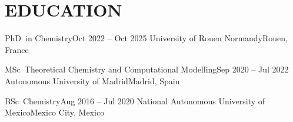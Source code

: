\section{EDUCATION}
\resumeSubHeadingListStart

  \resumeSubheading
    {PhD\ in Chemistry}{Oct 2022 -- Oct 2025}
    {University of Rouen Normandy}{Rouen, France}
  \resumeItemListStart
  \resumeItemListEnd

  \resumeSubheading
    {MSc\ Theoretical Chemistry and Computational Modelling}{Sep 2020 -- Jul 2022}
    {Autonomous University of Madrid}{Madrid, Spain}
  \resumeItemListStart
  \resumeItemListEnd

  \resumeSubheading
    {BSc\ Chemistry}{Aug 2016 -- Jul 2020}
    {National Autonomous University of Mexico}{Mexico City, Mexico}
  \resumeItemListStart
  \resumeItemListEnd

\resumeSubHeadingListEnd
